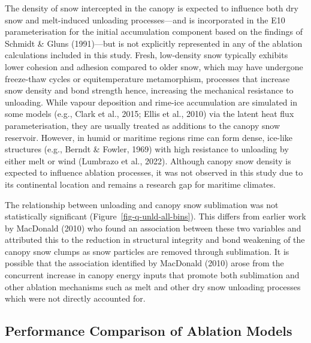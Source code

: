 \documentclass[
]{agujournal2019}
\begin{document}
The density of snow intercepted in the canopy is expected to influence
both dry snow and melt-induced unloading processes---and is incorporated
in the E10 parameterisation for the initial accumulation component based
on the findings of Schmidt \& Gluns (1991)---but is not explicitly
represented in any of the ablation calculations included in this study.
Fresh, low-density snow typically exhibits lower cohesion and adhesion
compared to older snow, which may have undergone freeze-thaw cycles or
equitemperature metamorphism, processes that increase snow density and
bond strength hence, increasing the mechanical resistance to unloading.
While vapour deposition and rime-ice accumulation are simulated in some
models (e.g., Clark et al., 2015; Ellis et al., 2010) via the latent
heat flux parameterisation, they are usually treated as additions to the
canopy snow reservoir. However, in humid or maritime regions rime can
form dense, ice-like structures (e.g., Berndt \& Fowler, 1969) with high
resistance to unloading by either melt or wind (Lumbrazo et al., 2022).
Although canopy snow density is expected to influence ablation
processes, it was not observed in this study due to its continental
location and remains a research gap for maritime climates.

The relationship between unloading and canopy snow sublimation was not
statistically significant (Figure~\ref{fig-q-unld-all-bins}). This
differs from earlier work by MacDonald (2010) who found an association
between these two variables and attributed this to the reduction in
structural integrity and bond weakening of the canopy snow clumps as
snow particles are removed through sublimation. It is possible that the
association identified by MacDonald (2010) arose from the concurrent
increase in canopy energy inputs that promote both sublimation and other
ablation mechanisms such as melt and other dry snow unloading processes
which were not directly accounted for.

\subsection{Performance Comparison of Ablation
Models}\label{performance-comparison-of-ablation-models}
\end{document}
